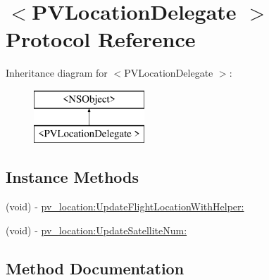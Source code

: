 \hypertarget{protocol_p_v_location_delegate_01-p}{}\section{$<$P\+V\+Location\+Delegate $>$ Protocol Reference}
\label{protocol_p_v_location_delegate_01-p}
Inheritance diagram for $<$P\+V\+Location\+Delegate $>$\+:\begin{figure}[H]
\begin{center}
\leavevmode
\includegraphics[height=2.000000cm]{protocol_p_v_location_delegate_01-p}
\end{center}
\end{figure}
\subsection*{Instance Methods}
\begin{DoxyCompactItemize}
\item 
(void) -\/ \hyperlink{protocol_p_v_location_delegate_01-p_a95de9b30d7d437c777f7c5e900cab455}{pv\+\_\+location\+:\+Update\+Flight\+Location\+With\+Helper\+:}
\item 
(void) -\/ \hyperlink{protocol_p_v_location_delegate_01-p_adc27ec7d1a4ddad3f7b98415549359b2}{pv\+\_\+location\+:\+Update\+Satellite\+Num\+:}
\end{DoxyCompactItemize}


\subsection{Method Documentation}
\mbox{\label{protocol_p_v_location_delegate_01-p_a95de9b30d7d437c777f7c5e900cab455}} 
